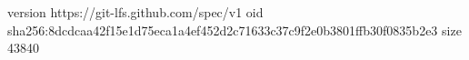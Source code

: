 version https://git-lfs.github.com/spec/v1
oid sha256:8dcdcaa42f15e1d75eca1a4ef452d2c71633c37c9f2e0b3801ffb30f0835b2e3
size 43840
